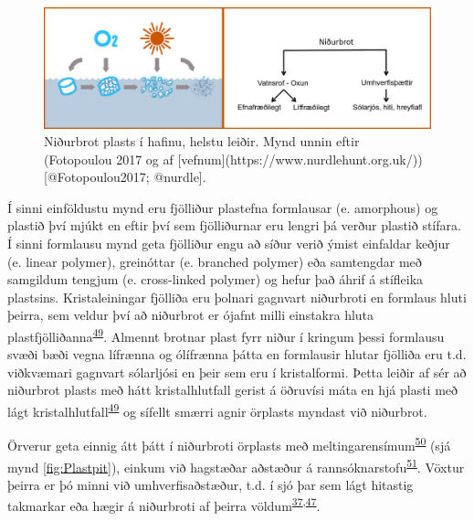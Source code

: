 \documentclass[icelandic,]{book}
\begin{document}
\begin{figure}

{\centering \includegraphics[width=1\linewidth]{myndir/small-plastics_FLAEDIRIT} 

}

\caption{Niðurbrot plasts í hafinu, helstu leiðir. Mynd unnin eftir (Fotopoulou 2017 og af [vefnum](https://www.nurdlehunt.org.uk/)) [@Fotopoulou2017; @nurdle].}\label{fig:flowchart}
\end{figure}

Í sinni einföldustu mynd eru fjölliður plastefna formlausar (e. amorphous) og plastið því mjúkt en eftir því sem fjölliðurnar eru lengri þá verður plastið stífara. Í sinni formlausu mynd geta fjölliður engu að síður verið ýmist einfaldar keðjur (e. linear polymer), greinóttar (e. branched polymer) eða samtengdar með samgildum tengjum (e. cross-linked polymer) og hefur það áhrif á stífleika plastsins. Kristaleiningar fjölliða eru þolnari gagnvart niðurbroti en formlaus hluti þeirra, sem veldur því að niðurbrot er ójafnt milli einstakra hluta plastfjölliðanna\textsuperscript{\protect\hyperlink{ref-andrady2017plastic}{49}}. Almennt brotnar plast fyrr niður í kringum þessi formlausu svæði bæði vegna lífrænna og ólífrænna þátta en formlausir hlutar fjölliða eru t.d. viðkvæmari gagnvart sólarljósi en þeir sem eru í kristalformi. Þetta leiðir af sér að niðurbrot plasts með hátt kristalhlutfall gerist á öðruvísi máta en hjá plasti með lágt kristalhlutfall\textsuperscript{\protect\hyperlink{ref-andrady2017plastic}{49}} og sífellt smærri agnir örplasts myndast við niðurbrot.

Örverur geta einnig átt þátt í niðurbroti örplasts með meltingarensímum\textsuperscript{\protect\hyperlink{ref-shah2008biological}{50}} (sjá mynd \ref{fig:Plastpit}), einkum við hagstæðar aðstæður á rannsóknarstofu\textsuperscript{\protect\hyperlink{ref-pacco2017biodegradation}{51}}. Vöxtur þeirra er þó minni við umhverfisaðstæður, t.d. í sjó þar sem lágt hitastig takmarkar eða hægir á niðurbroti af þeirra völdum\textsuperscript{\protect\hyperlink{ref-andrady2011microplastics}{37},\protect\hyperlink{ref-barnes2009accumulation}{47}}.
\end{document}
